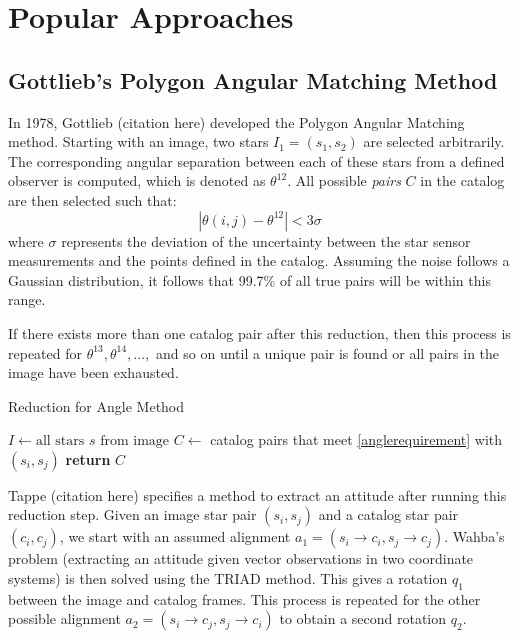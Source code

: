 \section{Popular Approaches}

\subsection{Gottlieb's Polygon Angular Matching Method}
In 1978, Gottlieb (citation here) developed the Polygon Angular Matching method. Starting with an image, two stars $I_1 = (s_1, s_2)$ are selected arbitrarily. The corresponding angular separation between each of these stars from a defined observer is computed, which is denoted as $\theta^{12}$. All possible \textit{pairs} $C$ in the catalog are then selected such that:
\begin{equation}
\label{anglerequirement}
| \theta(i, j) - \theta^{12} | < 3 \sigma
\end{equation}
where $\sigma$ represents the deviation of the uncertainty between the star sensor measurements and the points defined in the catalog. Assuming the noise follows a Gaussian distribution, it follows that 99.7\% of all true pairs will be within this range.

If there exists more than one catalog pair after this reduction, then this process is repeated for $\theta^{13}, \theta^{14}, ...,$ and so on until a unique pair is found or all pairs in the image have been exhausted. 

\begin{algorithm}
\caption{Reduction for Angle Method}
\label{Angle Reduction}
\begin{algorithmic}[1]

\State $I \gets \text{all stars } s \text{ from image}$
\State $C \gets $ catalog pairs that meet \eqref{anglerequirement} with $(s_i, s_j)$
\State \textbf{return} $C$
\EndIf
\EndFor
\EndFor
\EndProcedure
\end{algorithmic}
\end{algorithm}

Tappe (citation here) specifies a method to extract an attitude after running this reduction step. Given an image star pair $(s_i, s_j)$ and a catalog star pair $(c_i, c_j)$, we start with an assumed alignment $a_1 = (s_i \rightarrow c_i, s_j \rightarrow c_j)$. Wahba's problem (extracting an attitude given vector observations in two coordinate systems) is then solved using the TRIAD method. This gives a rotation $q_1$ between the image and catalog frames. This process is repeated for the other possible alignment $a_2 = (s_i \rightarrow c_j, s_j \rightarrow c_i)$ to obtain a second rotation $q_2$. 

